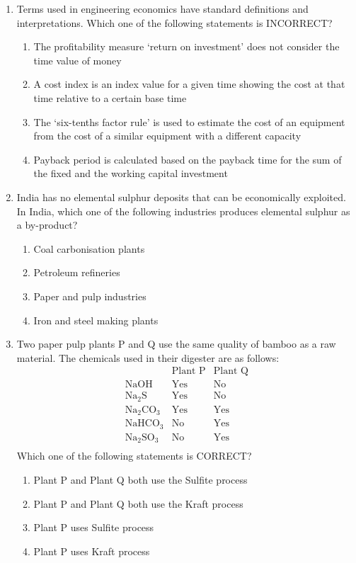 \documentclass[journal,12pt,onecolumn]{IEEEtran}
\theoremstyle{remark}
\begin{document}
\begin{enumerate}
\item Terms used in engineering economics have standard definitions and interpretations. Which one of the following statements is INCORRECT?
\hfill{}
\begin{enumerate}
\item The profitability measure `return on investment' does not consider the time value of money
\item A cost index is an index value for a given time showing the cost at that time relative to a certain base time
\item The `six-tenths factor rule' is used to estimate the cost of an equipment from the cost of a similar equipment with a different capacity
\item Payback period is calculated based on the payback time for the sum of the fixed and the working capital investment
\end{enumerate}

\item India has no elemental sulphur deposits that can be economically exploited. In India, which one of the following industries produces elemental sulphur as a by-product?
\hfill{}
\begin{enumerate}
\item Coal carbonisation plants
\item  Petroleum refineries
\item  Paper and pulp industries
\item  Iron and steel making plants
\end{enumerate}

\item Two paper pulp plants P and Q use the same quality of bamboo as a raw material. The chemicals used in their digester are as follows:
\[\begin{array}{c|c|c}& \text{Plant P} & \text{Plant Q} \\\hline\text{NaOH} & \text{Yes} & \text{No} \\\text{Na}_2\text{S} & \text{Yes} & \text{No} \\\text{Na}_2\text{CO}_3 & \text{Yes} & \text{Yes} \\\text{NaHCO}_3 & \text{No} & \text{Yes} \\\text{Na}_2\text{SO}_3 & \text{No} & \text{Yes} \\\end{array}\]
Which one of the following statements is CORRECT?
\hfill{}
\begin{enumerate}
\item Plant P and Plant Q both use the Sulfite process
\item Plant P and Plant Q both use the Kraft process
\item Plant P uses Sulfite process
\item Plant P uses Kraft process
\end{enumerate}


\end{enumerate}
\end{document}
